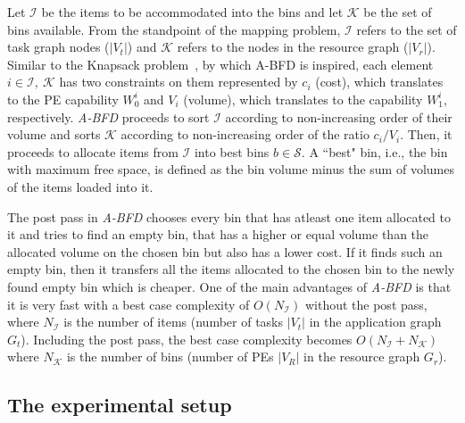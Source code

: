 Let $\mathcal{I}$ be the items to be accommodated into the bins and let
$\mathcal{K}$ be the set of bins available.  From the standpoint of the
mapping problem, $\mathcal{I}$ refers to the set of task graph nodes
($|V_t|$) and $\mathcal{K}$ refers to the nodes in the resource graph
($|V_r|$). Similar to the Knapsack problem~\cite{sski08}, by which A-BFD
is inspired, each element $i \in \mathcal{I},\ \mathcal{K}$ has two
constraints on them represented by $c_i$ (cost), which translates to the
PE capability $W^i_0$ and $V_i$ (volume), which translates to the
capability $W^i_1$, respectively.
\textit{A-BFD} proceeds to sort $\mathcal{I}$ according
to non-increasing order of their volume and sorts $\mathcal{K}$
according to non-increasing order of the ratio $c_i/V_i$. Then, it
proceeds to allocate items from $\mathcal{I}$ into best bins $b \in
\mathcal{S}$. A ``best" bin, i.e., the bin with maximum free space, is
defined as the bin volume minus the sum of volumes of the items loaded
into it. %

The post pass in \textit{A-BFD} chooses every bin that has atleast one
item allocated to it and tries to find an empty bin, that has a higher
or equal volume than the allocated volume on the chosen bin but also has
a lower cost. If it finds such an empty bin, then it transfers all the
items allocated to the chosen bin to the newly found empty bin which is
cheaper. One of the main advantages of \textit{A-BFD} is that it is very
fast with a best case complexity of $O(N_\mathcal{I})$ without the post
pass, where $N_\mathcal{I}$ is the number of items (number of tasks
$|V_t|$ in the application graph $G_t$). Including the post pass, the
best case complexity becomes $O(N_\mathcal{I} + N_\mathcal{K})$ where
$N_\mathcal{K}$ is the number of bins (number of PEs $|V_R|$ in the
resource graph $G_r$).

\subsection{The experimental setup}
\label{sec:experimental-setup}


